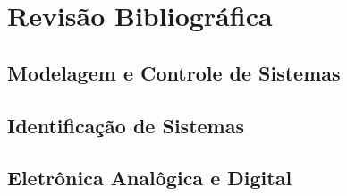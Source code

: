 \chapter{Revisão Bibliográfica}

\section{Modelagem e Controle de Sistemas}


\section{ Identificação de Sistemas}


\section{Eletrônica Analôgica e Digital}


